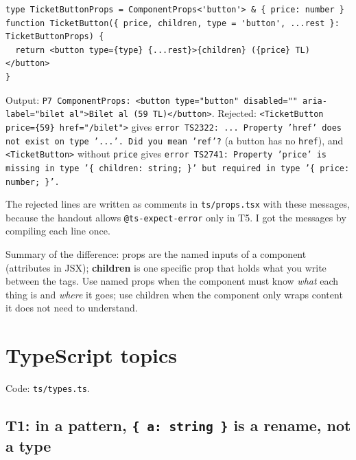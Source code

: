 \documentclass[
  10pt,
]{article}
\begin{document}
\begin{verbatim}
type TicketButtonProps = ComponentProps<'button'> & { price: number }
function TicketButton({ price, children, type = 'button', ...rest }: TicketButtonProps) {
  return <button type={type} {...rest}>{children} ({price} TL)</button>
}
\end{verbatim}

Output:
\texttt{P7 ComponentProps:\allowbreak{} <button type=\allowbreak{}"button" disabled=\allowbreak{}"" aria-label=\allowbreak{}"bilet al">Bilet al (\allowbreak{}59 TL)</\allowbreak{}button>}.
Rejected:
\texttt{<TicketButton price=\allowbreak{}\{59\} href=\allowbreak{}"/\allowbreak{}bilet">}
gives
\texttt{error TS2322:\allowbreak{} .\allowbreak{}.\allowbreak{}.\allowbreak{} Property 'href' does not exist on type '.\allowbreak{}.\allowbreak{}.\allowbreak{}'.\allowbreak{} Did you mean 'ref'?}
(a button has no \texttt{href}), and \texttt{<TicketButton>} without
\texttt{price} gives
\texttt{error TS2741:\allowbreak{} Property 'price' is missing in type '\{ children:\allowbreak{} string; \}' but required in type '\{ price:\allowbreak{} number; \}'.\allowbreak{}}

The rejected lines are written as comments in
\texttt{ts/\allowbreak{}props.\allowbreak{}tsx} with these messages,
because the handout allows \texttt{@ts-expect-error} only in T5. I got
the messages by compiling each line once.

Summary of the difference: props are the named inputs of a component
(attributes in JSX); \textbf{children} is one specific prop that holds
what you write between the tags. Use named props when the component must
know \emph{what} each thing is and \emph{where} it goes; use children
when the component only wraps content it does not need to understand.

\hypertarget{typescript-topics}{%
\section{TypeScript topics}\label{typescript-topics}}

Code: \texttt{ts/\allowbreak{}types.\allowbreak{}ts}.

\hypertarget{t1-in-a-pattern--a-string--is-a-rename-not-a-type}{%
\subsection{\texorpdfstring{T1: in a pattern,
\texttt{\{ a:\allowbreak{} string \}} is a rename, not a
type}{T1: in a pattern,  is a rename, not a type}}\label{t1-in-a-pattern--a-string--is-a-rename-not-a-type}}
\end{document}

